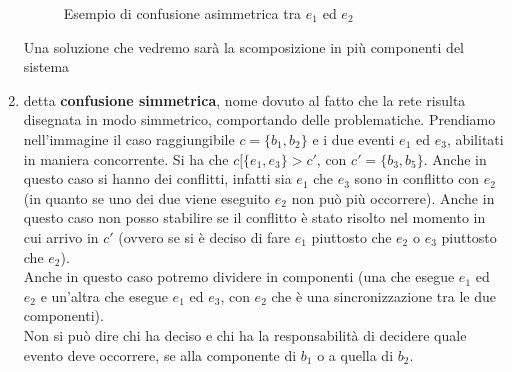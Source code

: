 \begin{definizione}
\begin{enumerate}
\begin{figure}[H]
      \caption{Esempio di confusione asimmetrica tra $e_1$ ed $e_2$} 
    \end{figure}
    Una soluzione che vedremo sarà la scomposizione in più componenti del
    sistema 
    \item detta \textbf{confusione simmetrica}, nome dovuto al fatto che la rete
    risulta disegnata in modo simmetrico, comportando delle
    problematiche. Prendiamo nell'immagine il caso raggiungibile $c=\{b_1, b_2\}$
    e i due eventi $e_1$ ed $e_3$, abilitati in maniera concorrente. Si ha che
    $c[\{e_1, e_3\}>c'$, con $c'=\{b_3, b_5\}$. Anche in questo caso si hanno dei
    conflitti, infatti sia $e_1$ che $e_3$ sono in conflitto con $e_2$ (in
    quanto se uno dei due viene eseguito $e_2$ non può più occorrere). Anche in
    questo caso non posso stabilire se il conflitto è stato risolto nel momento
    in cui arrivo in $c'$ (ovvero se si è deciso di fare $e_1$ piuttosto che
    $e_2$ o $e_3$ piuttosto che $e_2$).\\
    Anche in questo caso potremo dividere in componenti (una che esegue $e_1$ ed
    $e_2$ e un'altra che esegue $e_1$ ed $e_3$, con $e_2$ che è una
    sincronizzazione tra le due componenti).\\
    Non si può dire chi ha deciso e chi ha la responsabilità di decidere quale
    evento deve occorrere, se alla componente di $b_1$ o a quella di $b_2$.\\
    \begin{figure}[H]
      \centering
\end{figure}
\end{enumerate}
\end{definizione}

